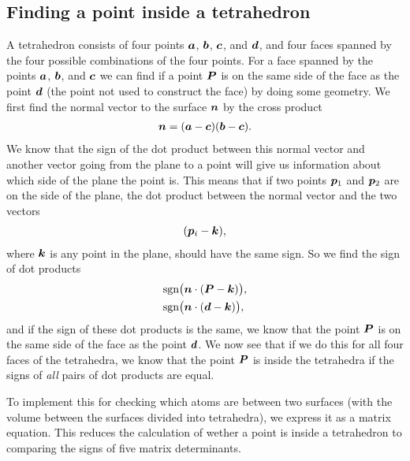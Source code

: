 \subsection{Finding a point inside a tetrahedron}
A tetrahedron consists of four points $\boldsymbol{a}$, $\boldsymbol{b}$, $\boldsymbol{c}$, and $\boldsymbol{d}$, and four faces spanned by the four possible combinations of the four points. For a face spanned by the points $\boldsymbol{a}$, $\boldsymbol{b}$, and $\boldsymbol{c}$ we can find if a point $\boldsymbol{P}$ is on the same side of the face as the point $\boldsymbol{d}$ (the point not used to construct the face) by doing some geometry. We first find the normal vector to the surface $\boldsymbol{n}$ by the cross product 
\begin{align*}
    \boldsymbol{n} = (\boldsymbol{a}-\boldsymbol{c})(\boldsymbol{b}-\boldsymbol{c}).
\end{align*}
We know that the sign of the dot product between this normal vector and another vector going from the plane to a point will give us information about which side of the plane the point is. This means that if two points $\boldsymbol{p}_1$ and $\boldsymbol{p}_2$ are on the side of the plane, the dot product between the normal vector and the two vectors
\begin{align*}
    (\boldsymbol{p}_i - \boldsymbol{k}),
\end{align*}
where $\boldsymbol{k}$ is any point in the plane, should have the same sign. So we find the sign of dot products
\begin{align*}
    &\text{sgn}\big(\boldsymbol{n}\cdot(\boldsymbol{P} - \boldsymbol{k})\big), \\
    &\text{sgn}\big(\boldsymbol{n}\cdot(\boldsymbol{d} - \boldsymbol{k})\big),
\end{align*}
and if the sign of these dot products is the same, we know that the point $\boldsymbol{P}$ is on the same side of the face as the point $\boldsymbol{d}$. We now see that if we do this for all four faces of the tetrahedra, we know that the point $\boldsymbol{P}$ is inside the tetrahedra if the signs of \emph{all} pairs of dot products are equal.

To implement this for checking which atoms are between two surfaces (with the volume between the surfaces divided into tetrahedra), we express it as a matrix equation. This reduces the calculation of wether a point is inside a tetrahedron to comparing the signs of five matrix determinants.

